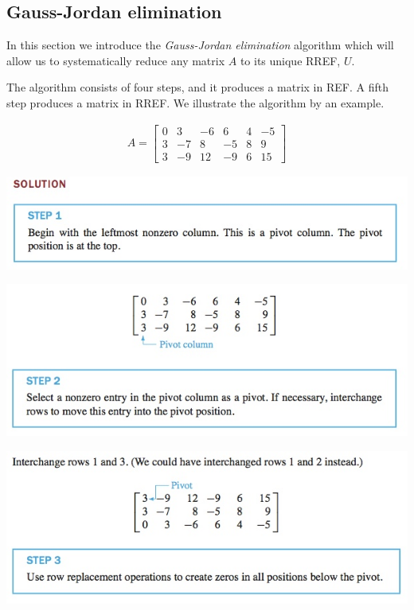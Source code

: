 \documentclass[12pt,letterpaper,reqno]{article}
\numberwithin{equation}{section}
\newcommand{\ti}[1]{\textit{#1}}
\begin{document}
\subsection{Gauss-Jordan elimination}
In this section we introduce the \ti{Gauss-Jordan elimination} algorithm which will allow us to systematically reduce any matrix $A$ to its unique RREF, $U$. 

The algorithm consists of four steps, and it produces a matrix in REF. A fifth step produces a matrix in RREF. We illustrate the algorithm by an example.
 
\begin{align*}
	A=\begin{bmatrix}
		0 & 3 & -6 & 6 & 4 & -5 \\
		3 & -7 & 8 & -5 & 8 & 9 \\
		3 & -9 & 12 & -9 & 6 & 15
	\end{bmatrix}
\end{align*}

\begin{center}
\includegraphics[scale=0.8]{figures_mvc/algo_step_1}	
\end{center}

\begin{center}
\includegraphics[scale=0.8]{figures_mvc/algo_step_2}	
\end{center}

\begin{center}
\includegraphics[scale=0.8]{figures_mvc/algo_step_3}	
\end{center}
\end{document}
